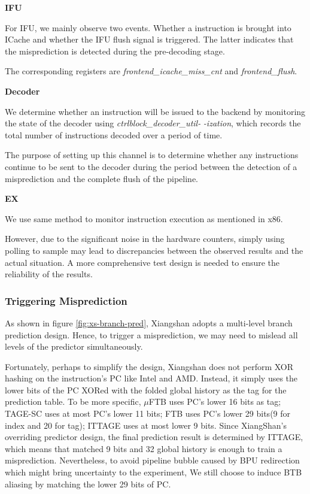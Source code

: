 \textbf{IFU}

For IFU, we mainly observe two events. Whether a instruction is brought into ICache and whether the IFU flush signal is triggered. The latter indicates that the misprediction is detected during the pre-decoding stage.

The corresponding registers are \textit{frontend\_icache\_miss\_cnt} and \textit{frontend\_flush}.

\textbf{Decoder}

We determine whether an instruction will be issued to the backend by monitoring the state of the decoder using \textit{ctrlblock\_decoder\_util-} \textit{-ization}, which records the total number of instructions decoded over a period of time.

The purpose of setting up this channel is to determine whether any instructions continue to be sent to the decoder during the period between the detection of a misprediction and the complete flush of the pipeline.

\textbf{EX}

We use same method to monitor instruction execution as mentioned in x86.

However, due to the significant noise in the hardware counters, simply using polling to sample may lead to discrepancies between the observed results and the actual situation\cite{hpc}. A more comprehensive test design is needed to ensure the reliability of the results.

\subsubsection{Triggering Misprediction}

As shown in figure \ref{fig:xs-branch-pred}, Xiangshan adopts a multi-level branch prediction design. Hence, to trigger a misprediction, we may need to mislead all levels of the predictor simultaneously.

Fortunately, perhaps to simplify the design, Xiangshan does not perform XOR hashing on the instruction's PC like Intel and AMD. Instead, it simply uses the lower bits of the PC XORed with the folded global history as the tag for the prediction table. To be more specific, $\mu$FTB uses PC's lower 16 bits as tag; TAGE-SC uses at most PC's lower 11 bits; FTB uses PC's lower 29 bits(9 for index and 20 for tag); ITTAGE uses at most lower 9 bits. Since XiangShan's overriding predictor design, the final prediction result is determined by ITTAGE, which means that matched 9 bits and 32 global history is enough to train a misprediction. Nevertheless, to avoid pipeline bubble caused by BPU redirection which might bring uncertainty to the experiment, We still choose to induce BTB aliasing by matching the lower 29 bits of PC.

